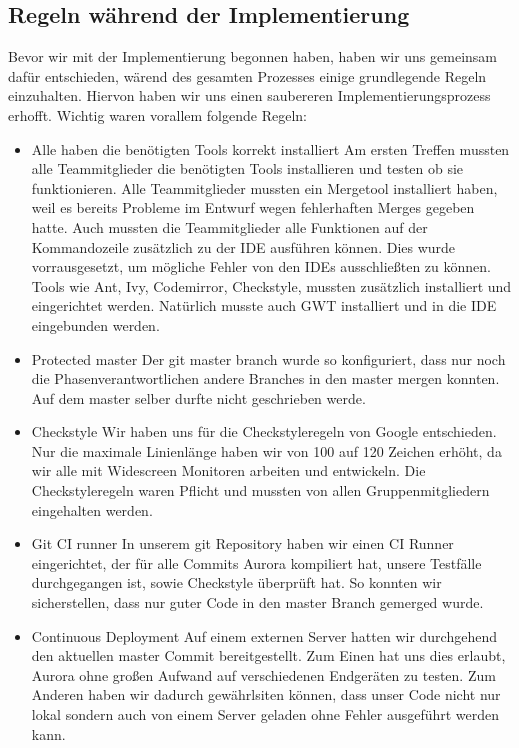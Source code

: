 \documentclass[parskip=full,11pt,twoside]{scrartcl}
\begin{document}
\subsection{Regeln während der Implementierung}
Bevor wir mit der Implementierung begonnen haben, haben wir uns gemeinsam dafür entschieden,
wärend des gesamten Prozesses einige grundlegende Regeln einzuhalten.
Hiervon haben wir uns einen saubereren Implementierungsprozess erhofft.
Wichtig waren vorallem folgende Regeln:
\begin{itemize}
	\item Alle haben die benötigten Tools korrekt installiert
	\newline
	Am ersten Treffen mussten alle Teammitglieder die benötigten Tools installieren und testen ob sie funktionieren.
	Alle Teammitglieder mussten ein Mergetool installiert haben, weil es bereits Probleme im Entwurf wegen fehlerhaften Merges gegeben hatte.
	Auch mussten die Teammitglieder alle Funktionen auf der Kommandozeile zusätzlich 	zu der IDE ausführen können. Dies wurde vorrausgesetzt, um mögliche Fehler von den IDEs ausschließten zu können.
	Tools wie Ant, Ivy, Codemirror, Checkstyle, mussten zusätzlich installiert und eingerichtet werden.
	Natürlich musste auch GWT installiert und in die IDE eingebunden werden.

    \item Protected master
        \newline
        Der git master branch wurde so konfiguriert, dass nur noch die Phasenverantwortlichen andere Branches in den master mergen konnten.
        Auf dem master selber durfte nicht geschrieben werde.
    \item Checkstyle
    \newline
    Wir haben uns für die Checkstyleregeln von Google entschieden. Nur die maximale Linienlänge haben wir von 100 auf 120 Zeichen erhöht, da wir alle mit Widescreen Monitoren arbeiten und entwickeln. Die Checkstyleregeln waren Pflicht und mussten von allen Gruppenmitgliedern eingehalten werden.
    \item Git CI runner
        \newline
        In unserem git Repository haben wir einen CI Runner eingerichtet, der für alle Commits Aurora kompiliert hat, unsere Testfälle durchgegangen ist, sowie Checkstyle überprüft hat.
        So konnten wir sicherstellen, dass nur guter Code in den master Branch gemerged wurde.

    \item Continuous Deployment
        \newline
        Auf einem externen Server hatten wir durchgehend den aktuellen master Commit bereitgestellt.
        Zum Einen hat uns dies erlaubt, Aurora ohne großen Aufwand auf verschiedenen Endgeräten zu testen.
        Zum Anderen haben wir dadurch gewährlsiten können, dass unser Code nicht nur lokal sondern auch von einem Server geladen ohne Fehler ausgeführt werden kann.


\end{itemize}
\end{document}
